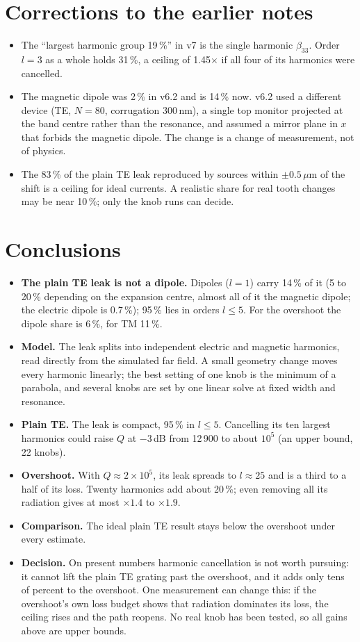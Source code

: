 \documentclass[11pt]{article}
\begin{document}
\section{Corrections to the earlier notes}
\begin{itemize}
\item The ``largest harmonic group 19\,\%'' in v7 is the single harmonic $\beta_{33}$. Order $l=3$ as a whole holds 31\,\%, a ceiling of 1.45$\times$ if all four of its harmonics were cancelled.
\item The magnetic dipole was 2\,\% in v6.2 and is 14\,\% now. v6.2 used a different device (TE, $N=80$, corrugation 300\,nm), a single top monitor projected at the band centre rather than the resonance, and assumed a mirror plane in $x$ that forbids the magnetic dipole. The change is a change of measurement, not of physics.
\item The 83\,\% of the plain TE leak reproduced by sources within $\pm0.5$\,$\mu$m of the shift is a ceiling for ideal currents. A realistic share for real tooth changes may be near 10\,\%; only the knob runs can decide.
\end{itemize}

\section{Conclusions}
\begin{itemize}
\item \textbf{The plain TE leak is not a dipole.} Dipoles ($l=1$) carry 14\,\% of it (5 to 20\,\% depending on the expansion centre, almost all of it the magnetic dipole; the electric dipole is 0.7\,\%); 95\,\% lies in orders $l\le5$. For the overshoot the dipole share is 6\,\%, for TM 11\,\%.
\item \textbf{Model.} The leak splits into independent electric and magnetic harmonics, read directly from the simulated far field. A small geometry change moves every harmonic linearly; the best setting of one knob is the minimum of a parabola, and several knobs are set by one linear solve at fixed width and resonance.
\item \textbf{Plain TE.} The leak is compact, 95\,\% in $l\le5$. Cancelling its ten largest harmonics could raise $Q$ at $-3$\,dB from 12\,900 to about $10^5$ (an upper bound, 22 knobs).
\item \textbf{Overshoot.} With $Q\approx2\times10^5$, its leak spreads to $l\approx25$ and is a third to a half of its loss. Twenty harmonics add about 20\,\%; even removing all its radiation gives at most $\times1.4$ to $\times1.9$.
\item \textbf{Comparison.} The ideal plain TE result stays below the overshoot under every estimate.
\item \textbf{Decision.} On present numbers harmonic cancellation is not worth pursuing: it cannot lift the plain TE grating past the overshoot, and it adds only tens of percent to the overshoot. One measurement can change this: if the overshoot's own loss budget shows that radiation dominates its loss, the ceiling rises and the path reopens. No real knob has been tested, so all gains above are upper bounds.
\end{itemize}
\end{document}
